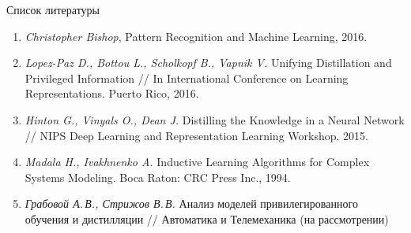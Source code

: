 \documentclass[9pt,pdf,hyperref={unicode}]{beamer}
\begin{document}
\begin{frame}{Список литературы}
\justifying
\begin{enumerate}
	\item \textit{Christopher Bishop}, Pattern Recognition and Machine Learning, 2016.
	\item \textit{Lopez-Paz D., Bottou L., Scholkopf B., Vapnik V.} Unifying Distillation and Privileged Information // In International Conference on Learning Representations. Puerto Rico, 2016.
	\item \textit{Hinton G., Vinyals O., Dean J.} Distilling the Knowledge in a Neural Network // NIPS Deep Learning and Representation Learning Workshop. 2015.
	\item \textit{Madala H., Ivakhnenko A.} Inductive Learning Algorithms for Complex Systems Modeling. Boca Raton: CRC Press Inc., 1994.
	\item \textit{Грабовой А.\,В., Стрижов В.\,В.} Анализ моделей привилегированного обучения и дистилляции // Автоматика и Телемеханика (на рассмотрении)
\end{enumerate}
\end{frame}

\end{document}
